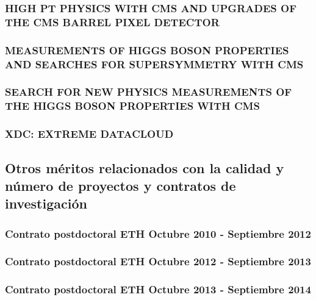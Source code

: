 \documentclass[a4paper, 11pt, twoside, openright]{report}
\begin{document}
\subsubsection{HIGH PT PHYSICS WITH CMS AND UPGRADES OF THE CMS BARREL PIXEL DETECTOR}


\subsubsection{MEASUREMENTS OF HIGGS BOSON PROPERTIES AND SEARCHES FOR SUPERSYMMETRY WITH CMS}


\subsubsection{SEARCH FOR NEW PHYSICS MEASUREMENTS OF THE HIGGS BOSON PROPERTIES WITH CMS}


\subsubsection{XDC: EXTREME DATACLOUD}


\subsection{Otros méritos relacionados con la calidad y número de proyectos y contratos de investigación}

\subsubsection{Contrato postdoctoral ETH Octubre 2010 - Septiembre 2012}


\subsubsection{Contrato postdoctoral ETH Octubre 2012 - Septiembre 2013}


\subsubsection{Contrato postdoctoral ETH Octubre 2013 - Septiembre 2014}

\end{document}
